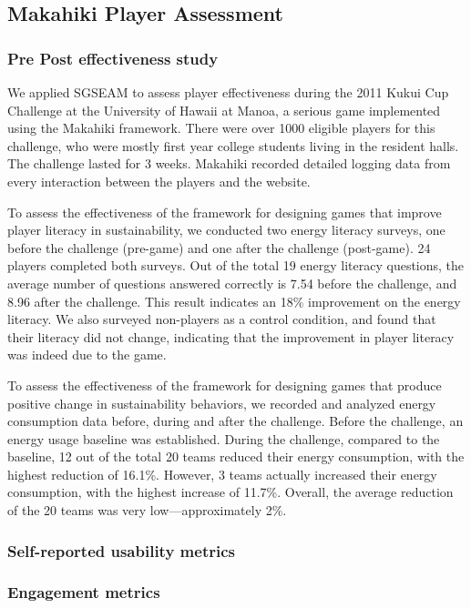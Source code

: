 \subsection{Makahiki Player Assessment}

\subsubsection{Pre Post effectiveness study}

We applied SGSEAM to assess player effectiveness during the 2011 Kukui Cup Challenge at
the University of Hawaii at Manoa, a serious game implemented using the Makahiki
framework. There were over 1000 eligible players for this challenge, who were mostly first
year college students living in the resident halls. The challenge lasted for 3 weeks.
Makahiki recorded detailed logging data from every interaction between the players and the
website.

To assess the effectiveness of the framework for designing games that improve player literacy in sustainability, we
conducted two energy literacy surveys, one before the challenge (pre-game) and one after
the challenge (post-game). 24 players completed both surveys. Out of the total 19 energy
literacy questions, the average number of questions answered correctly is 7.54 before the
challenge, and 8.96 after the challenge. This result indicates an 18\% improvement on the
energy literacy.  We also surveyed non-players as a control condition, and found that
their literacy did not change, indicating that the improvement in player literacy was
indeed due to the game.

To assess the effectiveness of the framework for designing games that produce positive change in sustainability
behaviors, we recorded and analyzed energy consumption data before, during and after the
challenge.  Before the challenge, an energy usage baseline was established. During the
challenge, compared to the baseline, 12 out of the total 20 teams reduced their energy
consumption, with the highest reduction of 16.1\%. However, 3 teams actually increased
their energy consumption, with the highest increase of 11.7\%. Overall, the average
reduction of the 20 teams was very low---approximately 2\%.

\subsubsection{Self-reported usability metrics}

\subsubsection{Engagement metrics}

